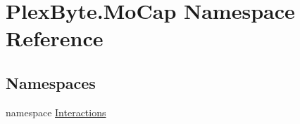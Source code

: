 \hypertarget{namespace_plex_byte_1_1_mo_cap}{}\section{Plex\+Byte.\+Mo\+Cap Namespace Reference}
\label{namespace_plex_byte_1_1_mo_cap}
\subsection*{Namespaces}
\begin{DoxyCompactItemize}
\item 
namespace \hyperlink{namespace_plex_byte_1_1_mo_cap_1_1_interactions}{Interactions}
\end{DoxyCompactItemize}
